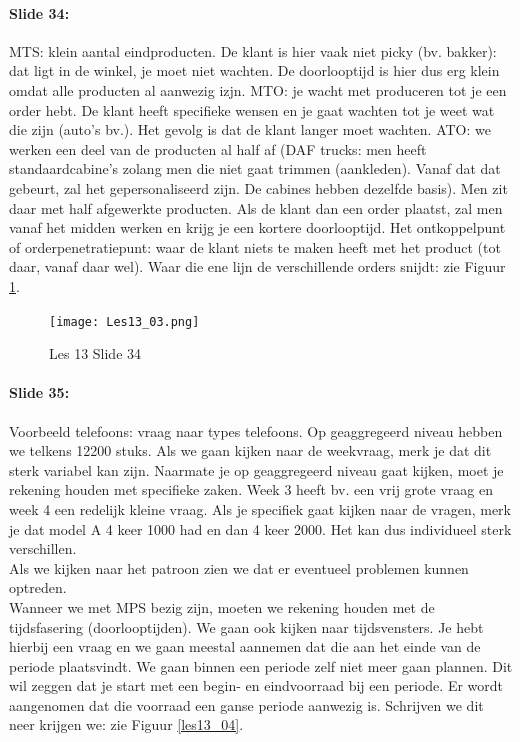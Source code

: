 \documentclass[10pt,a4paper]{report}
\begin{document}
\paragraph{Slide 34:} MTS: klein aantal eindproducten. De klant is hier vaak niet picky (bv. bakker): dat ligt in de winkel, je moet niet wachten. De doorlooptijd is hier dus erg klein omdat alle producten al aanwezig izjn. MTO: je wacht met produceren tot je een order hebt. De klant heeft specifieke wensen en je gaat wachten tot je weet wat die zijn (auto's bv.). Het gevolg is dat de klant langer moet wachten. ATO: we werken een deel van de producten al half af (DAF trucks: men heeft standaardcabine's zolang men die niet gaat trimmen (aankleden). Vanaf dat dat gebeurt, zal het gepersonaliseerd zijn. De cabines hebben dezelfde basis). Men zit daar met half afgewerkte producten. Als de klant dan een order plaatst, zal men vanaf het midden werken en krijg je een kortere doorlooptijd.
Het ontkoppelpunt of orderpenetratiepunt: waar de klant niets te maken heeft met het product (tot daar, vanaf daar wel). Waar die ene lijn de verschillende orders snijdt: zie Figuur \ref{les13_03}.

\begin{figure}[h!]
\centering
\texttt{[image: Les13\_03.png]}
\caption{Les 13 Slide 34} 
\label{les13_03}
\end{figure}


\paragraph{Slide 35:} Voorbeeld telefoons: vraag naar types telefoons. Op geaggregeerd niveau hebben we telkens 12200 stuks. Als we gaan kijken naar de weekvraag, merk je dat dit sterk variabel kan zijn. Naarmate je op geaggregeerd niveau gaat kijken, moet je rekening houden met specifieke zaken. Week 3 heeft bv. een vrij grote vraag en week 4 een redelijk kleine vraag. Als je specifiek gaat kijken naar de vragen, merk je dat model A 4 keer 1000 had en dan 4 keer 2000. Het kan dus individueel sterk verschillen.\\
Als we kijken naar het patroon zien we dat er eventueel problemen kunnen optreden.\\
Wanneer we met MPS bezig zijn, moeten we rekening houden met de tijdsfasering (doorlooptijden). We gaan ook kijken naar tijdsvensters. Je hebt hierbij een vraag en we gaan meestal aannemen dat die aan het einde van de periode plaatsvindt. We gaan binnen een periode zelf niet meer gaan plannen. Dit wil zeggen dat je start met een begin- en eindvoorraad bij een periode. Er wordt aangenomen dat die voorraad een ganse periode aanwezig is. Schrijven we dit neer krijgen we: zie Figuur \ref{les13_04}.
\end{document}
